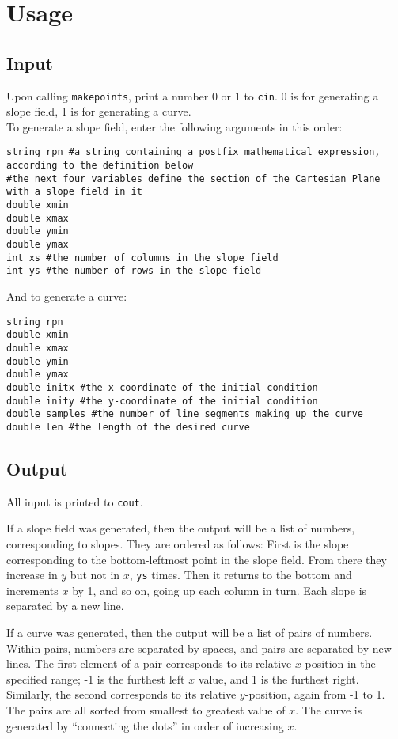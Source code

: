 \documentclass{article}
\begin{document}
\section{Usage}
\subsection{Input}

Upon calling \lstinline{makepoints}, print a number 0 or 1 to \lstinline{cin}. 0 is for generating a slope field, 1 is for generating a curve.\\
To generate a slope field, enter the following arguments in this order:

\begin{verbatim}
string rpn #a string containing a postfix mathematical expression, according to the definition below
#the next four variables define the section of the Cartesian Plane with a slope field in it
double xmin
double xmax
double ymin
double ymax
int xs #the number of columns in the slope field
int ys #the number of rows in the slope field
\end{verbatim}

And to generate a curve:
\begin{verbatim}
string rpn
double xmin
double xmax
double ymin
double ymax
double initx #the x-coordinate of the initial condition
double inity #the y-coordinate of the initial condition
double samples #the number of line segments making up the curve
double len #the length of the desired curve
\end{verbatim}
\subsection{Output}
All input is printed to \lstinline{cout}.

If a slope field was generated, then the output will be a list of numbers, corresponding to slopes. They are ordered as follows: First is the slope corresponding to the bottom-leftmost point in the slope field. From there they increase in $y$ but not in $x$, \lstinline{ys} times. Then it returns to the bottom and increments $x$ by 1, and so on, going up each column in turn. Each slope is separated by a new line.

If a curve was generated, then the output will be a list of pairs of numbers. Within pairs, numbers are separated by spaces, and pairs are separated by new lines. The first element of a pair corresponds to its relative $x$-position in the specified range; -1 is the furthest left $x$ value, and 1 is the furthest right. Similarly, the second corresponds to its relative $y$-position, again from -1 to 1. The pairs are all sorted from smallest to greatest value of $x$. The curve is generated by ``connecting the dots'' in order of increasing $x$.
\end{document}
